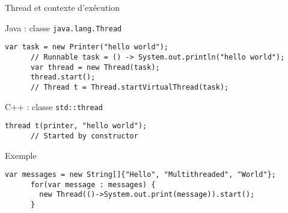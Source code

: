 
\begingroup

\begin{frame}[fragile]{Thread et contexte d'exécution}

  \begin{block}{Java : classe \lstinline{java.lang.Thread}}
    \begin{lstlisting}[gobble=6]
      var task = new Printer("hello world");
      // Runnable task = () -> System.out.println("hello world");
      var thread = new Thread(task);
      thread.start();
      // Thread t = Thread.startVirtualThread(task); 
    \end{lstlisting}
  \end{block}

  \begin{block}{C++ : classe \lstinline{std::thread}}
    \begin{lstlisting}[gobble=6]
      thread t(printer, "hello world");
      // Started by constructor
    \end{lstlisting}
  \end{block}

  \begin{exampleblock}{Exemple}
    \begin{lstlisting}[gobble=6]
      var messages = new String[]{"Hello", "Multithreaded", "World"};
      for(var message : messages) {
        new Thread(()->System.out.print(message)).start();
      }
    \end{lstlisting}
  \end{exampleblock}


\end{frame}

\endgroup
\endinput
